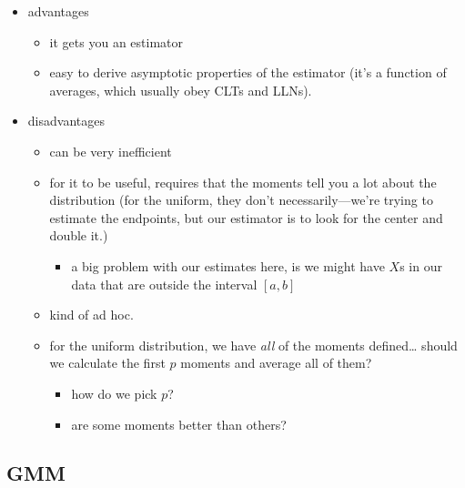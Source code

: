\begin{itemize}
\item advantages
  \begin{itemize}
  \item it gets you an estimator
  \item easy to derive asymptotic properties of the estimator (it's a
    function of averages, which usually obey CLTs and LLNs).
  \end{itemize}
\item disadvantages
  \begin{itemize}
  \item can be very inefficient
  \item for it to be useful, requires that the moments tell you a lot
    about the distribution (for the uniform, they don't
    necessarily—we're trying to estimate the endpoints, but our
    estimator is to look for the center and double it.)
    \begin{itemize}
    \item a big problem with our estimates here, is we might have $X$s
      in our data that are outside the interval $[a,b]$
    \end{itemize}
  \item kind of ad hoc.
  \item for the uniform distribution, we have \emph{all} of the
    moments defined… should we calculate the first $p$ moments and
    average all of them?
    \begin{itemize}
    \item how do we pick $p$?
    \item are some moments better than others?
    \end{itemize}
  \end{itemize}
\end{itemize}

\subsection{GMM}

